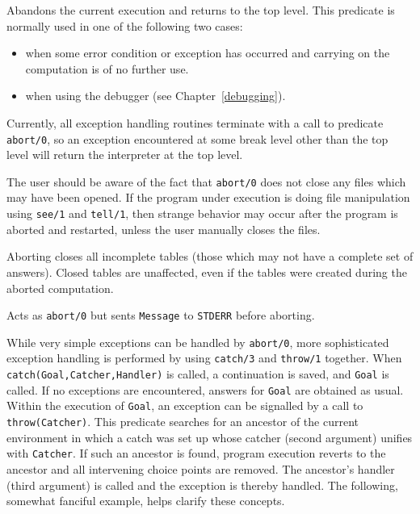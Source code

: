 \begin{description}

    Abandons the current execution and returns to the top level.  This
    predicate is normally used in one of the following two cases: 
    \begin{itemize} 
    \item when some error condition or exception has occurred and carrying
	  on the computation is of no further use.
    \item when using the debugger (see Chapter~\ref{debugging}).  
    \end{itemize}
    Currently, all exception handling routines terminate with a call to 
    predicate {\tt abort/0}, so an exception encountered at some break level 
    other than the top level will return the interpreter at the top level.

    The user should be aware of the fact that {\tt abort/0} does not close 
    any files which may have been opened.  If the program under execution is 
    doing file manipulation using {\tt see/1} and {\tt tell/1}, then strange 
    behavior may occur after the program is aborted and restarted, unless
    the user manually closes the files.

    Aborting closes all incomplete tables (those which may not have a 
    complete set of answers).  Closed tables are unaffected, even if 
    the tables were created during the aborted computation.

 
    Acts as {\tt abort/0} but sents {\tt Message} to {\tt STDERR}
    before aborting.

\vspace{-7mm}
While very simple exceptions can be handled by {\tt abort/0}, more
sophisticated exception handling is performed by using {\tt catch/3}
and {\tt throw/1} together.  When {\tt catch(Goal,Catcher,Handler)} is
called, a continuation is saved, and {\tt Goal} is called.  If no
exceptions are encountered, answers for {\tt Goal} are obtained as
usual.  Within the execution of {\tt Goal}, an exception can be
signalled by a call to {\tt throw(Catcher)}.  This predicate searches
for an ancestor of the current environment in which a catch was set up
whose catcher (second argument) unifies with {\tt Catcher}.  If such
an ancestor is found, program execution reverts to the ancestor and
all intervening choice points are removed.  The ancestor's handler
(third argument) is called and the exception is thereby handled.  The
following, somewhat fanciful example, helps clarify these concepts.


\end{description}
